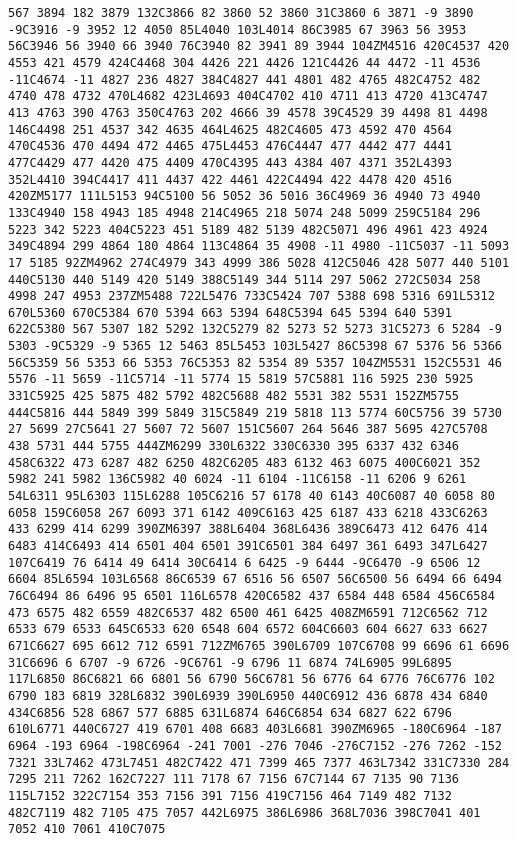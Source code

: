 \documentclass[
]{article}
\begin{document}
\begin{verbatim}
567 3894 182 3879 132C3866 82 3860 52 3860 31C3860 6 3871 -9 3890 -9C3916 -9 3952 12 4050 85L4040 103L4014 86C3985 67 3963 56 3953 56C3946 56 3940 66 3940 76C3940 82 3941 89 3944 104ZM4516 420C4537 420 4553 421 4579 424C4468 304 4426 221 4426 121C4426 44 4472 -11 4536 -11C4674 -11 4827 236 4827 384C4827 441 4801 482 4765 482C4752 482 4740 478 4732 470L4682 423L4693 404C4702 410 4711 413 4720 413C4747 413 4763 390 4763 350C4763 202 4666 39 4578 39C4529 39 4498 81 4498 146C4498 251 4537 342 4635 464L4625 482C4605 473 4592 470 4564 470C4536 470 4494 472 4465 475L4453 476C4447 477 4442 477 4441 477C4429 477 4420 475 4409 470C4395 443 4384 407 4371 352L4393 352L4410 394C4417 411 4437 422 4461 422C4494 422 4478 420 4516 420ZM5177 111L5153 94C5100 56 5052 36 5016 36C4969 36 4940 73 4940 133C4940 158 4943 185 4948 214C4965 218 5074 248 5099 259C5184 296 5223 342 5223 404C5223 451 5189 482 5139 482C5071 496 4961 423 4924 349C4894 299 4864 180 4864 113C4864 35 4908 -11 4980 -11C5037 -11 5093 17 5185 92ZM4962 274C4979 343 4999 386 5028 412C5046 428 5077 440 5101 440C5130 440 5149 420 5149 388C5149 344 5114 297 5062 272C5034 258 4998 247 4953 237ZM5488 722L5476 733C5424 707 5388 698 5316 691L5312 670L5360 670C5384 670 5394 663 5394 648C5394 645 5394 640 5391 622C5380 567 5307 182 5292 132C5279 82 5273 52 5273 31C5273 6 5284 -9 5303 -9C5329 -9 5365 12 5463 85L5453 103L5427 86C5398 67 5376 56 5366 56C5359 56 5353 66 5353 76C5353 82 5354 89 5357 104ZM5531 152C5531 46 5576 -11 5659 -11C5714 -11 5774 15 5819 57C5881 116 5925 230 5925 331C5925 425 5875 482 5792 482C5688 482 5531 382 5531 152ZM5755 444C5816 444 5849 399 5849 315C5849 219 5818 113 5774 60C5756 39 5730 27 5699 27C5641 27 5607 72 5607 151C5607 264 5646 387 5695 427C5708 438 5731 444 5755 444ZM6299 330L6322 330C6330 395 6337 432 6346 458C6322 473 6287 482 6250 482C6205 483 6132 463 6075 400C6021 352 5982 241 5982 136C5982 40 6024 -11 6104 -11C6158 -11 6206 9 6261 54L6311 95L6303 115L6288 105C6216 57 6178 40 6143 40C6087 40 6058 80 6058 159C6058 267 6093 371 6142 409C6163 425 6187 433 6218 433C6263 433 6299 414 6299 390ZM6397 388L6404 368L6436 389C6473 412 6476 414 6483 414C6493 414 6501 404 6501 391C6501 384 6497 361 6493 347L6427 107C6419 76 6414 49 6414 30C6414 6 6425 -9 6444 -9C6470 -9 6506 12 6604 85L6594 103L6568 86C6539 67 6516 56 6507 56C6500 56 6494 66 6494 76C6494 86 6496 95 6501 116L6578 420C6582 437 6584 448 6584 456C6584 473 6575 482 6559 482C6537 482 6500 461 6425 408ZM6591 712C6562 712 6533 679 6533 645C6533 620 6548 604 6572 604C6603 604 6627 633 6627 671C6627 695 6612 712 6591 712ZM6765 390L6709 107C6708 99 6696 61 6696 31C6696 6 6707 -9 6726 -9C6761 -9 6796 11 6874 74L6905 99L6895 117L6850 86C6821 66 6801 56 6790 56C6781 56 6776 64 6776 76C6776 102 6790 183 6819 328L6832 390L6939 390L6950 440C6912 436 6878 434 6840 434C6856 528 6867 577 6885 631L6874 646C6854 634 6827 622 6796 610L6771 440C6727 419 6701 408 6683 403L6681 390ZM6965 -180C6964 -187 6964 -193 6964 -198C6964 -241 7001 -276 7046 -276C7152 -276 7262 -152 7321 33L7462 473L7451 482C7422 471 7399 465 7377 463L7342 331C7330 284 7295 211 7262 162C7227 111 7178 67 7156 67C7144 67 7135 90 7136 115L7152 322C7154 353 7156 391 7156 419C7156 464 7149 482 7132 482C7119 482 7105 475 7057 442L6975 386L6986 368L7036 398C7041 401 7052 410 7061 410C7075 
\end{verbatim}
\end{document}

